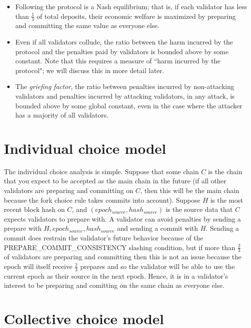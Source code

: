 \documentclass[12pt]{article}
\begin{document}
\begin{itemize}
\item Following the protocol is a Nash equilibrium; that is, if each validator has less than $\frac{1}{3}$ of total deposits, their economic welfare is maximized by preparing and committing the same value as everyone else.
\item Even if all validators collude, the ratio between the harm incurred by the protocol and the penalties paid by validators is bounded above by some constant. Note that this requires a measure of ``harm incurred by the protocol"; we will discuss this in more detail later.
\item The \textit{griefing factor}, the ratio between penalties incurred by non-attacking validators and penalties incurred by attacking validators, in any attack, is bounded above by some global constant, even in the case where the attacker has a majority of all validators.
\end{itemize}

\section{Individual choice model}

The individual choice analysis is simple. Suppose that some chain $C$ is the chain that you expect to be accepted as the main chain in the future (if all other validators are preparing and committing on $C$, then this will be the main chain because the fork choice rule takes commits into account). Suppose $H$ is the most recent block hash on $C$, and $(epoch_{source}, hash_{source})$ is the source data that $C$ expects validators to prepare with. A validator can avoid penalties by sending a prepare with $H, epoch_{source}, hash_{source}$ and sending a commit with $H$. Sending a commit does restrain the validator's future behavior because of the PREPARE\_COMMIT\_CONSISTENCY slashing condition, but if more than $\frac{2}{3}$ of validators are preparing and committing then this is not an issue because the epoch will itself receive $\frac{2}{3}$ prepares and so the validator will be able to use the current epoch as their source in the next epoch. Hence, it is in a validator's interest to be preparing and comitting on the same chain as everyone else.

\section{Collective choice model}
\end{document}
